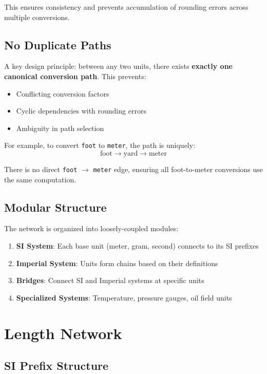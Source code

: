 \documentclass[11pt,a4paper]{report}
\begin{document}
This ensures consistency and prevents accumulation of rounding errors across multiple conversions.

\subsection{No Duplicate Paths}

A key design principle: between any two units, there exists \textbf{exactly one canonical conversion path}. This prevents:
\begin{itemize}[leftmargin=*]
  \item Conflicting conversion factors
  \item Cyclic dependencies with rounding errors
  \item Ambiguity in path selection
\end{itemize}

For example, to convert \texttt{foot} to \texttt{meter}, the path is uniquely:
\[
\text{foot} \rightarrow \text{yard} \rightarrow \text{meter}
\]

There is no direct \texttt{foot} $\rightarrow$ \texttt{meter} edge, ensuring all foot-to-meter conversions use the same computation.

\subsection{Modular Structure}

The network is organized into loosely-coupled modules:
\begin{enumerate}[leftmargin=*]
  \item \textbf{SI System}: Each base unit (meter, gram, second) connects to its SI prefixes
  \item \textbf{Imperial System}: Units form chains based on their definitions
  \item \textbf{Bridges}: Connect SI and Imperial systems at specific units
  \item \textbf{Specialized Systems}: Temperature, pressure gauges, oil field units
\end{enumerate}

\section{Length Network}

\subsection{SI Prefix Structure}
\end{document}
